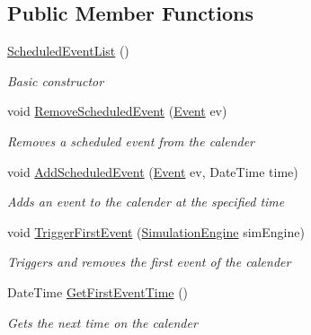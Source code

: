 \subsection*{Public Member Functions}
\begin{DoxyCompactItemize}
\item 
\hyperlink{class_simulation_core_1_1_simulation_classes_1_1_scheduled_event_list_a2f75e318db3b34a60082422a85931b67}{Scheduled\+Event\+List} ()
\begin{DoxyCompactList}\small\item\em Basic constructor \end{DoxyCompactList}\item 
void \hyperlink{class_simulation_core_1_1_simulation_classes_1_1_scheduled_event_list_a4d02b1bc55bc72958697bfd1c33616e8}{Remove\+Scheduled\+Event} (\hyperlink{class_simulation_core_1_1_h_c_c_m_elements_1_1_event}{Event} ev)
\begin{DoxyCompactList}\small\item\em Removes a scheduled event from the calender \end{DoxyCompactList}\item 
void \hyperlink{class_simulation_core_1_1_simulation_classes_1_1_scheduled_event_list_a746e9b26c85e5620600254fc2ac81b60}{Add\+Scheduled\+Event} (\hyperlink{class_simulation_core_1_1_h_c_c_m_elements_1_1_event}{Event} ev, Date\+Time time)
\begin{DoxyCompactList}\small\item\em Adds an event to the calender at the specified time \end{DoxyCompactList}\item 
void \hyperlink{class_simulation_core_1_1_simulation_classes_1_1_scheduled_event_list_a60a968e2a5056d0c0e0d6152b03e2cfe}{Trigger\+First\+Event} (\hyperlink{class_simulation_core_1_1_simulation_classes_1_1_simulation_engine}{Simulation\+Engine} sim\+Engine)
\begin{DoxyCompactList}\small\item\em Triggers and removes the first event of the calender \end{DoxyCompactList}\item 
Date\+Time \hyperlink{class_simulation_core_1_1_simulation_classes_1_1_scheduled_event_list_a42482ae071dfca41af39493447f6c6c9}{Get\+First\+Event\+Time} ()
\begin{DoxyCompactList}\small\item\em Gets the next time on the calender \end{DoxyCompactList}\end{DoxyCompactItemize}
